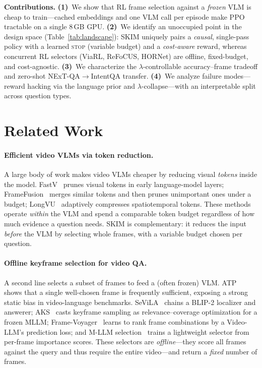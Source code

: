 \documentclass{article}
\begin{document}
\noindent\textbf{Contributions.}
\textbf{(1)}~We show that RL frame selection against a \emph{frozen} VLM is cheap to
train---cached embeddings and one VLM call per episode make PPO tractable on a single
$8$\,GB GPU. \textbf{(2)}~We identify an unoccupied point in the design space
(Table~\ref{tab:landscape}): SKIM uniquely pairs a \emph{causal}, single-pass policy
with a learned \textsc{stop} (variable budget) and a \emph{cost-aware} reward, whereas
concurrent RL selectors (ViaRL, ReFoCUS, HORNet) are offline, fixed-budget, and
cost-agnostic. \textbf{(3)}~We characterize the $\lambda$-controllable accuracy--frame
tradeoff and zero-shot NExT-QA$\rightarrow$IntentQA transfer. \textbf{(4)}~We analyze
failure modes---reward hacking via the language prior and $\lambda$-collapse---with an
interpretable split across question types.

\section{Related Work}
\label{sec:related}

\paragraph{Efficient video VLMs via token reduction.}
A large body of work makes video VLMs cheaper by reducing visual \emph{tokens}
inside the model. FastV~\citep{fastv} prunes visual tokens in early
language-model layers; FrameFusion~\citep{framefusion} merges similar tokens and
then prunes unimportant ones under a budget; LongVU~\citep{longvu} adaptively
compresses spatiotemporal tokens. These methods operate \emph{within} the VLM and
spend a comparable token budget regardless of how much evidence a question needs.
SKIM is complementary: it reduces the input \emph{before} the VLM by selecting
whole frames, with a variable budget chosen per question.

\paragraph{Offline keyframe selection for video QA.}
A second line selects a subset of frames to feed a (often frozen) VLM. ATP
~\citep{atp} shows that a single well-chosen frame is frequently sufficient,
exposing a strong static bias in video-language benchmarks. SeViLA~\citep{sevila}
chains a BLIP-2 localizer and answerer; AKS~\citep{aks} casts keyframe sampling as
relevance--coverage optimization for a frozen MLLM; Frame-Voyager~\citep{framevoyager}
learns to rank frame combinations by a Video-LLM's prediction loss; and
M-LLM selection~\citep{mllmselect} trains a lightweight selector from per-frame
importance scores. These selectors are \emph{offline}---they score all frames
against the query and thus require the entire video---and return a \emph{fixed}
number of frames.
\end{document}
